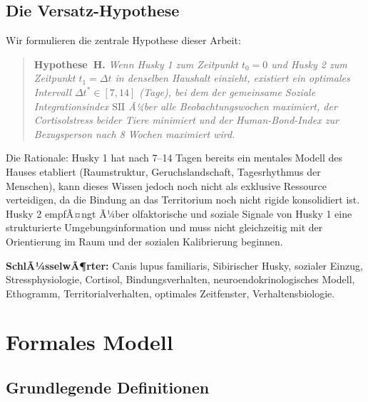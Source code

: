 ﻿\documentclass[12pt, a4paper]{article}
\theoremstyle{plain}
\theoremstyle{definition}
\theoremstyle{remark}
\newcommand{\SII}{\mathrm{SII}}
\newcommand{\dt}{\Delta t}
\begin{document}
\subsection{Die Versatz-Hypothese}

Wir formulieren die zentrale Hypothese dieser Arbeit:

\begin{quote}
\textbf{Hypothese~H.} \itshape Wenn Husky 1 zum Zeitpunkt $t_0 = 0$ und Husky 2 zum Zeitpunkt
$t_1 = \dt$ in denselben Haushalt einzieht, existiert ein optimales Intervall
$\dt^* \in [7, 14]$ (Tage), bei dem der gemeinsame Soziale Integrationsindex
$\SII$ Ã¼ber alle Beobachtungswochen maximiert, der Cortisolstress beider Tiere
minimiert und der Human-Bond-Index zur Bezugsperson nach 8 Wochen maximiert
wird.
\end{quote}

Die Rationale: Husky 1 hat nach 7--14 Tagen bereits ein mentales Modell des
Hauses etabliert (Raumstruktur, Geruchslandschaft, Tagesrhythmus der Menschen),
kann dieses Wissen jedoch noch nicht als exklusive Ressource verteidigen, da
die Bindung an das Territorium noch nicht rigide konsolidiert ist. Husky 2
empfÃ¤ngt Ã¼ber olfaktorische und soziale Signale von Husky 1 eine strukturierte
Umgebungsinformation und muss nicht gleichzeitig mit der Orientierung im Raum
und der sozialen Kalibrierung beginnen.

\textbf{SchlÃ¼sselwÃ¶rter:} Canis lupus familiaris, Sibirischer Husky,
sozialer Einzug, Stressphysiologie, Cortisol, Bindungsverhalten,
neuroendokrinologisches Modell, Ethogramm, Territorialverhalten, optimales
Zeitfenster, Verhaltensbiologie.

\section{Formales Modell}
\label{sec:modell}

\subsection{Grundlegende Definitionen}
\end{document}
